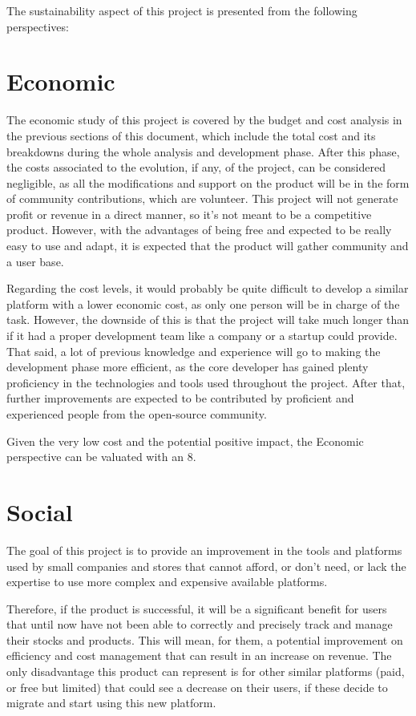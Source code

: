 The sustainability aspect of this project is presented from the following perspectives:

\section{Economic}
\label{sec:131}
The economic study of this project is covered by the budget and cost analysis in the previous sections of this document, which include the total cost and its breakdowns during the whole analysis and development phase. After this phase, the costs associated to the evolution, if any, of the project, can be considered negligible, as all the modifications and support on the product will be in the form of community contributions, which are volunteer. This project will not generate profit or revenue in a direct manner, so it’s not meant to be a competitive product. However, with the advantages of being free and expected to be really easy to use and adapt, it is expected that the product will gather community and a user base.

Regarding the cost levels, it would probably be quite difficult to develop a similar platform with a lower economic cost, as only one person will be in charge of the task. However, the downside of this is that the project will take much longer than if it had a proper development team like a company or a startup could provide. That said, a lot of previous knowledge and experience will go to making the development phase more efficient, as the core developer has gained plenty proficiency in the technologies and tools used throughout the project. After that, further improvements are expected to be contributed by proficient and experienced people from the open-source community.

Given the very low cost and the potential positive impact, the Economic perspective can be valuated with an 8. 

\section{Social}
\label{sec:132}
The goal of this project is to provide an improvement in the tools and platforms used by small companies and stores that cannot afford, or don’t need, or lack the expertise to use more complex and expensive available platforms.

Therefore, if the product is successful, it will be a significant benefit for users that until now have not been able to correctly and precisely track and manage their stocks and products. This will mean, for them, a potential improvement on efficiency and cost management that can result in an increase on revenue. The only disadvantage this product can represent is for other similar platforms (paid, or free but limited) that could see a decrease on their users, if these decide to migrate and start using this new platform.

